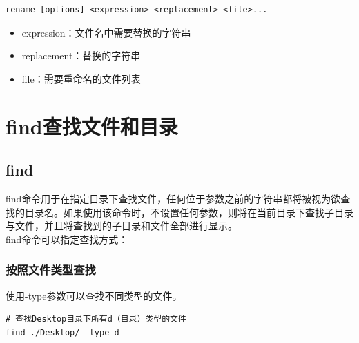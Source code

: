\documentclass[12pt, openany, oneside]{book}
\begin{document}
\vspace{-0.5cm}

\begin{lstlisting}
rename [options] <expression> <replacement> <file>...
\end{lstlisting}

\begin{itemize}
    \item expression：文件名中需要替换的字符串

    \item replacement：替换的字符串

    \item file：需要重命名的文件列表
\end{itemize}

\newpage

\section{find查找文件和目录}

\subsection{find}

find命令用于在指定目录下查找文件，任何位于参数之前的字符串都将被视为欲查找的目录名。如果使用该命令时，不设置任何参数，则将在当前目录下查找子目录与文件，并且将查找到的子目录和文件全部进行显示。\\

find命令可以指定查找方式：

\subsubsection{按照文件类型查找}

使用-type参数可以查找不同类型的文件。

\vspace{-0.5cm}

\begin{lstlisting}
# 查找Desktop目录下所有d（目录）类型的文件
find ./Desktop/ -type d
\end{lstlisting}
\end{document}

